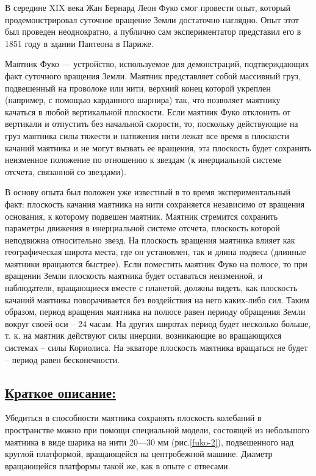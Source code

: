 \documentclass[14pt,a4paper,oneside]{extarticle}	%
\begin{document}
В середине XIX века Жан Бернард Леон Фуко смог провести опыт, который продемонстрировал суточное вращение Земли достаточно наглядно. 
Опыт этот был проведен неоднократно, а публично сам экспериментатор представил его в 1851 году в здании Пантеона в Париже.
									
Маятник Фуко — устройство, используемое для демонстраций, подтверждающих факт суточного вращения Земли.
Маятник представляет собой массивный груз, подвешенный на проволоке или нити, верхний конец которой укреплен (например, с помощью карданного шарнира) так, что позволяет маятнику качаться в любой вертикальной плоскости. 
Если маятник Фуко отклонить от вертикали и отпустить без начальной скорости, то, 
			поскольку действующие на груз маятника силы тяжести и натяжения нити лежат все время в плоскости качаний маятника и не могут вызвать ее вращения, эта плоскость будет сохранять неизменное положение
			по отношению к звездам (к инерциальной системе отсчета, связанной со звездами). 
			
В основу опыта был положен уже известный в то время экспериментальный факт: 
плоскость качания маятника на нити сохраняется независимо от вращения основания, к которому подвешен маятник. 
Маятник стремится сохранить параметры движения в инерциальной системе отсчета, плоскость которой неподвижна относительно звезд. 
На плоскость вращения маятника влияет как географическая широта места, где он установлен, так и длина подвеса (длинные маятники вращаются быстрее).	
Если поместить маятник Фуко на полюсе, то при вращении Земли плоскость маятника будет 
оставаться неизменной, и наблюдатели, вращающиеся вместе с планетой, должны видеть, 
как плоскость качаний маятника поворачивается без воздействия на него каких-либо сил. 
Таким образом, период вращения маятника на полюсе равен периоду обращения Земли вокруг своей оси – 24 часам. 
На других широтах период будет несколько больше, т. к. на маятник действуют силы инерции, возникающие во вращающихся системах – силы Кориолиса. 
На экваторе плоскость маятника вращаться не будет – период равен бесконечности.

	\subsection*{\underline{Краткое описание:}}
	
	Убедиться в способности маятника сохранять плоскость колебаний в пространстве можно при помощи специальной модели, состоящей из небольшого маятника в виде шарика на нити 20—30 мм (рис.\ref{fuko-2}), подвешенного над круглой платформой, вращающейся на центробежной машине.
	Диаметр вращающейся платформы такой же, как в опыте с отвесами. %
	
\end{document}
